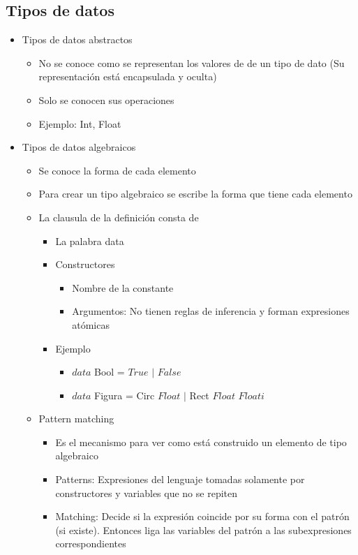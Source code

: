\documentclass[a4paper,10pt]{article}
\begin{document}
\subsection{Tipos de datos}
    \begin{itemize}
		\item Tipos de datos abstractos
	    	\begin{itemize}
			\item No se conoce como se representan los valores de de un tipo de dato (Su representación está encapsulada y oculta)
			\item Solo se conocen sus operaciones
			\item Ejemplo: Int, Float
	    	\end{itemize}
		\item Tipos de datos algebraicos
	    	\begin{itemize}
			\item Se conoce la forma de cada elemento
			\item Para crear un tipo algebraico se escribe la forma que tiene cada elemento
			\item La clausula de la definición consta de
			\begin{itemize}
		   		\item La palabra data
		    		\item Constructores
		    		\begin{itemize}
					\item Nombre de la constante
					\item Argumentos:  No tienen reglas de inferencia y forman expresiones atómicas
		    		\end{itemize}
		    		\item Ejemplo
		    		\begin{itemize}
		    			\item $data$ Bool = $True$ $|$ $False$
		    			\item $data$ Figura = Circ $Float$ $|$ Rect $Float$ $Floati$
				\end{itemize}	
		    	\end{itemize}
			\item Pattern matching
		    	\begin{itemize}
				\item Es el mecanismo para ver como está construido un elemento de tipo algebraico
				\item Patterns: Expresiones del lenguaje tomadas solamente por constructores y variables que no se repiten
				\item Matching: Decide si la expresión coincide por su forma con el patrón (si existe). Entonces liga las variables del patrón a las subexpresiones correspondientes

\end{itemize}
\end{itemize}
\end{itemize}
\end{document}
